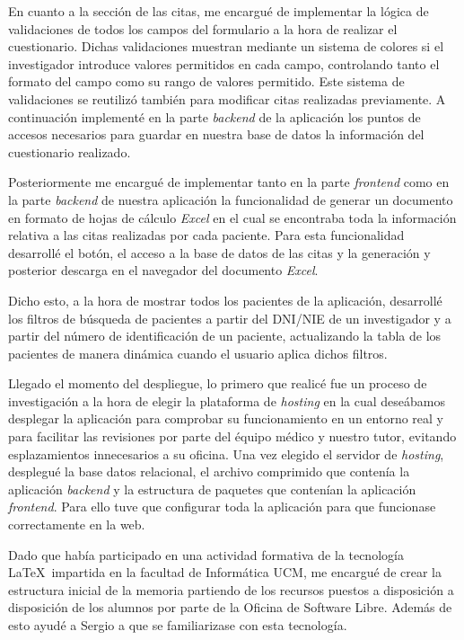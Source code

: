 En cuanto a la sección de las citas, me encargué de implementar la lógica de validaciones de todos los campos del formulario a la hora de realizar el cuestionario. Dichas validaciones muestran mediante un sistema de colores si el investigador introduce valores permitidos en cada campo, controlando tanto el formato del campo como su rango de valores permitido. Este sistema de validaciones se reutilizó también para modificar citas realizadas previamente. A continuación implementé en la parte \textit{backend} de la aplicación los puntos de accesos necesarios para guardar en nuestra base de datos la información  del cuestionario realizado. \newline

Posteriormente me encargué de implementar tanto en la parte \textit{frontend} como en la parte \textit{backend} de nuestra aplicación la funcionalidad de generar un documento en formato de hojas de cálculo \textit{Excel} en el cual se encontraba toda la información relativa a las citas realizadas por cada paciente. Para esta funcionalidad desarrollé el botón, el acceso a la base de datos de las citas y la generación y posterior descarga en el navegador del documento \textit{Excel}. \newline

Dicho esto, a la hora de mostrar todos los pacientes de la aplicación, desarrollé los filtros de búsqueda de pacientes a partir del DNI/NIE de un investigador y a partir del número de identificación de un paciente, actualizando la tabla de los pacientes de manera dinámica cuando el usuario aplica dichos filtros. \newline

Llegado el momento del despliegue, lo primero que realicé fue un proceso de investigación a la hora de elegir la plataforma de \textit{hosting} en la cual deseábamos desplegar la aplicación para comprobar su funcionamiento en un entorno real y para facilitar las revisiones por parte del équipo médico y nuestro tutor, evitando esplazamientos innecesarios a su oficina. Una vez elegido el servidor de \textit{hosting}, desplegué la base datos relacional, el archivo comprimido que contenía la aplicación \textit{backend} y la estructura de paquetes que contenían la aplicación \textit{frontend}. Para ello tuve que configurar toda la aplicación para que funcionase correctamente en la web. \newline

Dado que había participado en una actividad formativa de la tecnología \LaTeX \    impartida en la facultad de Informática UCM, me encargué de crear la estructura inicial de la memoria partiendo de los recursos puestos a disposición a disposición de los alumnos por parte de la Oficina de Software Libre. Además de esto ayudé a Sergio  a que se familiarizase con esta tecnología. \newline







